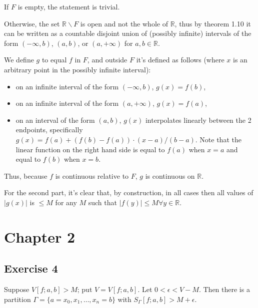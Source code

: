 \documentclass{article}
\begin{document}
\typstmathinputenable{\$}

If $F$ is empty, the statement is trivial.

Otherwise, the set $ℝ ∖ F$ is open and not the whole of $ℝ$, thus by theorem 1.10 it can be written as a countable disjoint union of (possibly infinite) intervals of the form $(-∞, b)$, $(a, b)$, or $(a,+∞)$ for $a, b ∈ ℝ$.

We define $g$ to equal $f$ in $F$, and outside $F$ it's defined as follows (where $x$ is an arbitrary point in the possibly infinite interval):
\begin{itemize}
    \item on an infinite interval of the form $(-∞, b)$, $g(x) = f(b)$,
    \item on an infinite interval of the form $(a,+∞)$, $g(x)=f(a)$,
    \item on an interval of the form $(a, b)$, $g(x)$ interpolates linearly between the 2 endpoints, specifically $g(x)=f(a) + (f(b)-f(a)) ⋅ (x-a)/(b-a)$. Note that the linear function on the right hand side is equal to $f(a)$ when $x=a$ and equal to $f(b)$ when $x=b$.
\end{itemize}
Thus, because $f$ is continuous relative to $F$, $g$ is continuous on $ℝ$.

For the second part, it's clear that, by construction, in all cases then all values of $|g(x)|$ is $≤ M$ for any $M$ such that $|f(y)|≤ M ∀y ∈ ℝ$.

\typstmathinputdisable{\$}

\section{Chapter 2}

\subsection{Exercise 4}%
Suppose $V[f; a, b] > M$; put $V = V[f; a, b]$. Let $0 < \epsilon < V - M$. Then there is a partition $\Gamma = \{a = x_{0}, x_{1}, \dots, x_{n} = b \}$ with $S_{\Gamma}[f; a, b] > M + \epsilon$. 
\end{document}
